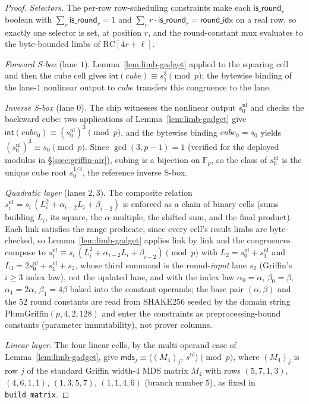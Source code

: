 \begin{proof}
\emph{Selectors.} The per-row row-scheduling constraints make each $\mathsf{is\_round}_r$ boolean with $\sum_r \mathsf{is\_round}_r = 1$ and $\sum_r r\cdot\mathsf{is\_round}_r = \mathsf{round\_idx}$ on a real row, so exactly one selector is set, at position $r$, and the round-constant mux evaluates to the byte-bounded limbs of $\mathrm{RC}[4r{+}\ell]$.

\emph{Forward S-box} (lane $1$). Lemma~\ref{lem:limb-gadget} applied to the squaring cell and then the cube cell gives $\mathsf{int}(\mathit{cube}) \equiv s_1^{3} \pmod{p}$; the bytewise binding of the lane-$1$ nonlinear output to $\mathit{cube}$ transfers this congruence to the lane.

\emph{Inverse S-box} (lane $0$). The chip witnesses the nonlinear output $s^{\mathrm{nl}}_0$ and checks the backward cube: two applications of Lemma~\ref{lem:limb-gadget} give $\mathsf{int}(\mathit{cube}_0) \equiv (s^{\mathrm{nl}}_0)^{3} \pmod{p}$, and the bytewise binding $\mathit{cube}_0 = s_0$ yields $(s^{\mathrm{nl}}_0)^{3} \equiv s_0 \pmod{p}$. Since $\gcd(3,p-1)=1$ (verified for the deployed modulus in \S\ref{ssec:griffin-air}), cubing is a bijection on $\mathbb{F}_p$, so the class of $s^{\mathrm{nl}}_0$ is the unique cube root $s_0^{1/3}$, the reference inverse S-box.

\emph{Quadratic layer} (lanes $2,3$). The composite relation $s^{\mathrm{nl}}_i = s_i\,(L_i^{2}+\alpha_{i-2}L_i+\beta_{i-2})$ is enforced as a chain of binary cells (sums building $L_i$, its square, the $\alpha$-multiple, the shifted sum, and the final product). Each link satisfies the range predicate, since every cell's result limbs are byte-checked, so Lemma~\ref{lem:limb-gadget} applies link by link and the congruences compose to $s^{\mathrm{nl}}_i \equiv s_i\,(L_i^{2}+\alpha_{i-2}L_i+\beta_{i-2}) \pmod{p}$ with $L_2 = s^{\mathrm{nl}}_0+s^{\mathrm{nl}}_1$ and $L_3 = 2s^{\mathrm{nl}}_0+s^{\mathrm{nl}}_1+s_2$, whose third summand is the round-\emph{input} lane $s_2$ (Griffin's $i\ge 3$ index law), not the updated lane, and with the index law $\alpha_0=\alpha$, $\beta_0=\beta$, $\alpha_1=2\alpha$, $\beta_1=4\beta$ baked into the constant operands; the base pair $(\alpha,\beta)$ and the $52$ round constants are read from $\mathrm{SHAKE256}$ seeded by the domain string $\mathrm{PlumGriffin}(p,4,2,128)$ and enter the constraints as preprocessing-bound constants (parameter immutability), not prover columns.

\emph{Linear layer}. The four linear cells, by the multi-operand case of Lemma~\ref{lem:limb-gadget}, give $\mathsf{mds}_j \equiv \bigl\langle (M_4)_j,\, s^{\mathrm{nl}} \bigr\rangle \pmod{p}$, where $(M_4)_j$ is row $j$ of the standard Griffin width-$4$ MDS matrix $M_4$ with rows $(5,7,1,3)$, $(4,6,1,1)$, $(1,3,5,7)$, $(1,1,4,6)$ (branch number $5$), as fixed in \texttt{build\_matrix}.


\end{proof}
